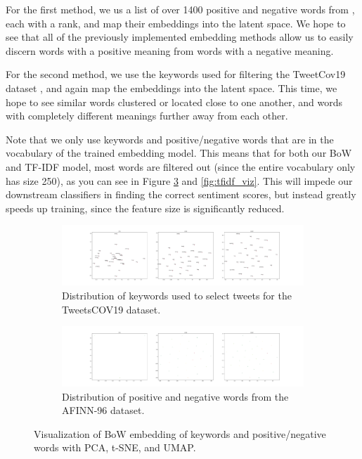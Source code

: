 For the first method, we us a list of over 1400 positive and negative words from \cite{AFINN}, each with a rank, and map their embeddings into the latent space. We hope to see that all of the previously implemented embedding methods allow us to easily discern words with a positive meaning from words with a negative meaning.

For the second method, we use the keywords used for filtering the TweetCov19 dataset \cite{tweetsdataset}, and again map the embeddings into the latent space. This time, we hope to see similar words clustered or located close to one another, and words with completely different meanings further away from each other.

Note that we only use keywords and positive/negative words that are in the vocabulary of the trained embedding model. This means that for both our BoW and TF-IDF model, most words are filtered out (since the entire vocabulary only has size 250), as you can see in Figure \ref{fig:bow_viz} and \ref{fig:tfidf_viz}. This will impede our downstream classifiers in finding the correct sentiment scores, but instead greatly speeds up training, since the feature size is significantly reduced.

\begin{figure}
 \centering
 \begin{subfigure}{\columnwidth}
 \includegraphics[width=1\textwidth]{images/keywords_bow.pdf}
  \caption{Distribution of keywords used to select tweets for the TweetsCOV19 dataset.}
 \label{fig:bow_key}
 \end{subfigure}
 \centering
 \begin{subfigure}{\columnwidth}
 \includegraphics[width=1\textwidth]{images/keywords_bow_posneg.pdf}
  \caption{Distribution of positive and negative words from the AFINN-96 dataset.}
  \label{fig:bow_posneg}
 \end{subfigure}
 \caption{Visualization of BoW embedding of keywords and positive/negative words with PCA, t-SNE, and UMAP.}
 \label{fig:bow_viz}
\end{figure}

